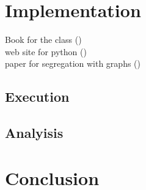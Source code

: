 \documentclass[letterpaper]{article}
\begin{document}
\section{Implementation}  

Book for the class  (\cite{10.5555/1805895})\\
web site for python (\cite{AdilMoujahid})\\
paper for segregation with graphs (\cite{ijcai2019-38})\\

\subsection{Execution}

\subsection{Analyisis}
 
\section{Conclusion}



\end{document}
